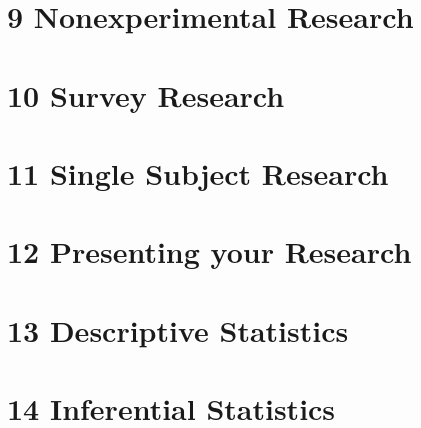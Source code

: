 \documentclass[oneside]{tufte-book}
\begin{document}
\chapter{9 Nonexperimental Research}


\chapter{10 Survey Research}


\chapter{11 Single Subject Research}


\chapter{12 Presenting your Research}


\chapter{13 Descriptive Statistics}


\chapter{14 Inferential Statistics}






\printindex
\end{document}
